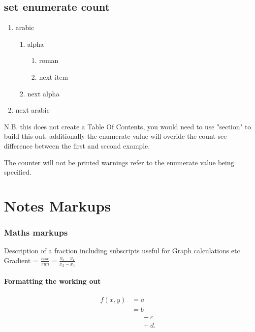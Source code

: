 \documentclass[fleqn]{report}
\begin{document}
\section{set enumerate count}
\begin{enumerate}[4] %
	\item arabic
	\begin{enumerate}
		\item alpha
			\begin{enumerate}
				\item roman
				\item next item
			\end{enumerate}
		\item next alpha			
	\end{enumerate}
	\item next arabic
\end{enumerate}

N.B. this does not create a Table Of Contents, you would need to use "section" to build this out, additionally the enumerate value will overide the count see difference between the first and second example. \vspace{\baselineskip}

The counter will not be printed warnings refer to the enumerate value being specified.
\clearpage

\chapter{Notes Markups}

\subsection{Maths markups}
Description of a fraction including subscripts useful for Graph calculations etc
Gradient = {\Large $\frac{rise}{run} = \frac{y_2-y_1}{x_2-x_1}$}

\subsubsection{Formatting the working out}
\begin{equation}
\begin{split}
	f(x,y) & =a\\
       & = b \\[1ex]
       &\phantom{=}\, +c \\[2ex]
       &\phantom{=}\, +d.
\end{split}
\end{equation}
\end{document}
